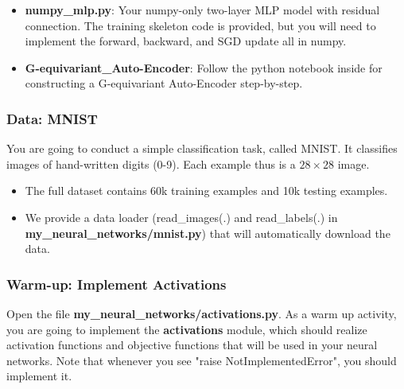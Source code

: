 \documentclass{article}
\begin{document}
\begin{itemize}
\item \textbf{numpy\_mlp.py}: Your numpy-only two-layer MLP model with residual connection. The training skeleton code is provided, but you will need to implement the forward, backward, and SGD update all in numpy.

\item \textbf{G-equivariant\_Auto-Encoder}: Follow the python notebook inside for constructing a G-equivariant Auto-Encoder step-by-step.

\end{itemize}


\subsubsection*{Data: MNIST}

You are going to conduct a simple classification task, called MNIST. It classifies images of hand-written digits (0-9). Each example thus is a \(28 \times 28\) image. 
\begin{itemize}
\item The full dataset contains 60k training examples and 10k testing examples.
\item We provide a data loader (read\_images(.) and read\_labels(.) in \textbf{my\_neural\_networks/mnist.py}) that will automatically download the data.
\end{itemize}


\subsubsection*{\bf Warm-up: Implement Activations}

\noindent Open the file \textbf{my\_neural\_networks/activations.py}.
As a warm up activity, you are going to implement the
\textbf{activations} module, which should realize activation functions and
objective functions that will be used in your neural networks. Note that whenever you see "raise NotImplementedError", you should implement it.
\end{document}
